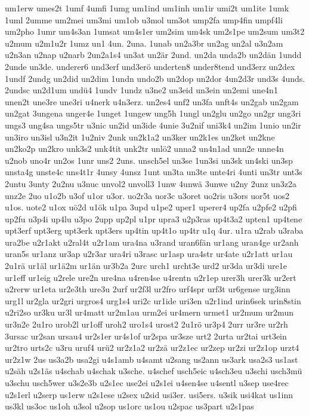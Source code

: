 {um1erw
umes2t
1umf
4umfi
1umg
um1ind
um1inh
um1ir
umi2t
um1ite
1umk
1uml
2umme
um2mei
um3mi
um1ob
u3mol
um3ot
ump2fa
ump4fin
umpf4li
um2pho
1umr
um4s3an
1umsat
um4s1er
um2sim
um4sk
um2s1pe
um2sum
um3t2
u2mum
u2m1u2r
1umz
un1
4un.
2una.
1unab
un2a3br
un2ag
un2al
u3n2am
u2n3an
u2nap
u2narb
2un2a1s4
un3at
un2är
2und.
un2da
unda2b
un2dän
1undd
2unde
un3de.
underer6
und3erf
und3erö
underten8
under8tend
und3erz
un2dex
1undf
2undg
un2did
un2dim
1undn
undo2b
un2dop
un2dor
4un2d3r
und3s
4unds.
2undsc
un2d1um
undü4
1undv
1undz
u3ne2
un3eid
un3ein
un2emi
une4n1
unen2t
une3re
une3ri
u4nerk
u4n3erz.
un2es4
unf2
un3fa
unft4s
un2gab
un2gam
un2gat
3ungena
unger4e
1unget
1ungew
ung5h
1ungl
un2glu
un2go
un2gr
ung3ri
ungs3
ung4sa
ungs5tr
u3nic
un2id
un3ide
4unie
3u2nif
uni3k4
un2im
1unio
un2ir
un3iro
un3isl
u3n2it
1u2niv
2unk
un2k1a2
un3ker
un2k1es
un2ket
un2kne
un2ko2p
un2kro
unk3s2
unk4tit
unk2tr
unlö2
unna2
un4n1ad
unn2e
unne4n
u2nob
uno4r
un2os
1unr
uns2
2uns.
unsch5el
un3se
1un3si
un3sk
un4ski
un3sp
unsta4g
unste4c
uns4t1r
4unsy
4unsz
1unt
un3ta
un3te
unte4ri
4unti
un3tr
unt3s
2untu
3unty
2u2nu
u3nuc
unvol2
unvoll3
1unw
4unwä
3unwe
u2ny
2unz
un3z2a
unz2e
2uo
u1o2b
u3of
u1or
u3or.
uo2r3a
uor3c
u3oret
uo2ris
u3ors
uor5t
uos2
u1os.
uote2
u1ox
uö2d
u1ök
u1pa
3upd
u1pe2
uper1
uperer4
up2fa
u2pfe2
u2pfi
up2fu
u3p4i
up4lu
u3po
2upp
up2pl
u1pr
upra3
u2p3ras
up4t3a2
upten1
up4tene
upt3erf
upt3erg
upt3erk
upt3ers
up4tin
up4t1o
up4tr
u1q
4ur.
u1ra
u2rab
u3raba
ura2be
u2r1akt
u2ral4t
u2r1am
ura4na
u3rand
uran6fän
ur1ang
uran4ge
ur2anh
uran5s
ur1anz
ur3ap
u2r3ar
ura4ri
u3rasc
ur1asp
ura4str
ur4ate
u2r1att
ur1au
2u1rä
ur1äl
ur1ä2m
ur1än
ur3b2a
2urc
urch1
urcht3e
urd2
ur3da
ur3di
ure1e
ur1eff
ur1eig
u2rele
ure2n
ure4na
u4ren4se
u4rentn
u2r1ep
urer3h
urer3k
ur2ert
u2rerw
ur1eta
ur2e3th
ure3u
2urf
ur2f3l
ur2fro
urf4spr
urf3t
ur6gense
urg3inn
urg1l
ur2gla
ur2gri
urgros4
urg1s4
uri2c
ur1ide
uri3en
u2r1ind
urin6sek
urin8stin
u2ri2so
ur3ku
ur3l
ur4matt
ur2m1au
urm2ei
ur4mern
urmet1
ur2mum
ur2mun
ur3n2e
2u1ro
urob2l
ur1off
uroh2
uro1s4
urost2
2u1rö
ur3p4
2urr
ur3re
ur2rh
3ursac
ur2san
ursau4
ur2s1er
ur4s1of
ur2spa
ur3sze
urt2
2urta
ur2tai
urt3ein
ur2tro
urts2c
u3ru
uruf4
urü2
ur2z1a2
ur2zä
ur2z1ec
ur2zep
ur2zi
ur2z1op
urzt4
ur2z1w
2us
us3a2b
usa2gi
u4s1amb
u4samt
u2sang
us2ann
us3ark
usa2s3
us1ast
u2säh
u2s1äs
u4schab
u4schak
u3sche.
u4schef
usch5eic
u4sch3eu
u3schi
usch3mü
u3schu
usch5wer
u3s2e3b
u2s1ec
use2ei
u2s1ei
u4sen4se
u4sentl
u3sep
use4rec
u2s1erl
u2serp
us1erw
u2s1ese
u2sex
u2sid
usi3er.
usi5ers.
u3sik
usi4kat
us1inn
us3kl
us3oc
us1oh
u3sol
u2sop
us1orc
us1ou
u2spac
us3part
u2s1pas
}
